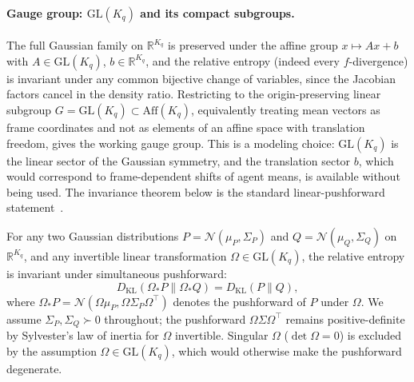 \paragraph{Gauge group: $\mathrm{GL}(K_q)$ and its compact subgroups.}
\label{sec:gauge_group_choice}
The full Gaussian family on $\mathbb{R}^{K_q}$ is preserved under the affine group $x \mapsto Ax + b$ with $A \in \mathrm{GL}(K_q)$, $b \in \mathbb{R}^{K_q}$, and the relative entropy (indeed every $f$-divergence) is invariant under any common bijective change of variables, since the Jacobian factors cancel in the density ratio. Restricting to the origin-preserving linear subgroup $G = \mathrm{GL}(K_q) \subset \mathrm{Aff}(K_q)$, equivalently treating mean vectors as frame coordinates and not as elements of an affine space with translation freedom, gives the working gauge group. This is a modeling choice: $\mathrm{GL}(K_q)$ is the linear sector of the Gaussian symmetry, and the translation sector $b$, which would correspond to frame-dependent shifts of agent means, is available without being used. The invariance theorem below is the standard linear-pushforward statement~\cite{Amari2016}.

\begin{theorem}
\label{thm:glk_invariance}
For any two Gaussian distributions $P = \mathcal{N}(\mu_P, \Sigma_P)$ and $Q = \mathcal{N}(\mu_Q, \Sigma_Q)$ on $\mathbb{R}^{K_q}$, and any invertible linear transformation $\Omega \in \mathrm{GL}(K_q)$, the relative entropy is invariant under simultaneous pushforward:
\begin{equation}
D_{\mathrm{KL}}(\Omega_* P \| \Omega_* Q) = D_{\mathrm{KL}}(P \| Q),
\label{eq:glk_invariance}
\end{equation}
where $\Omega_* P = \mathcal{N}(\Omega\mu_P, \Omega\Sigma_P\Omega^\top)$ denotes the pushforward of $P$ under $\Omega$. We assume $\Sigma_P, \Sigma_Q \succ 0$ throughout; the pushforward $\Omega\Sigma\Omega^\top$ remains positive-definite by Sylvester's law of inertia for $\Omega$ invertible. Singular $\Omega$ ($\det\Omega = 0$) is excluded by the assumption $\Omega \in \mathrm{GL}(K_q)$, which would otherwise make the pushforward degenerate.
\end{theorem}

